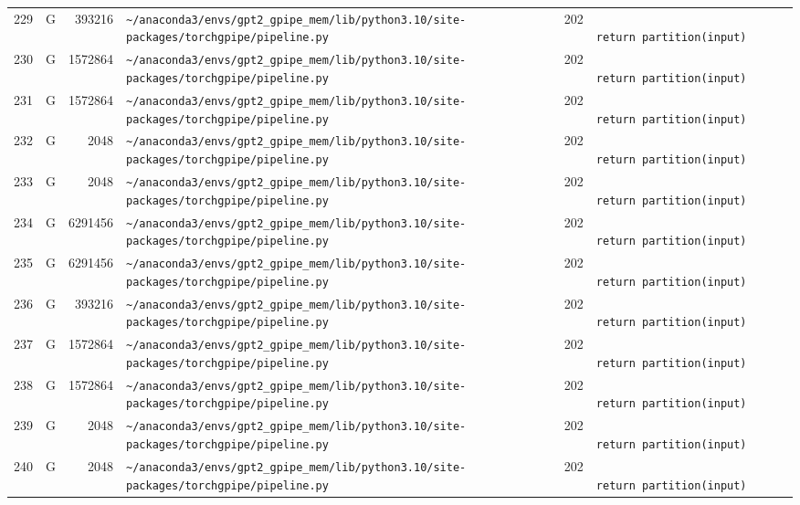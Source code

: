 \documentclass{article}
\begin{document}
\begin{longtable}{r l r p{6.5cm} r p{7.0cm}}
229 & G & 393216 & \lstinline|~/anaconda3/envs/gpt2_gpipe_mem/lib/python3.10/site-packages/torchgpipe/pipeline.py| & 202 & \lstinline|                        return partition(input)| \\
230 & G & 1572864 & \lstinline|~/anaconda3/envs/gpt2_gpipe_mem/lib/python3.10/site-packages/torchgpipe/pipeline.py| & 202 & \lstinline|                        return partition(input)| \\
231 & G & 1572864 & \lstinline|~/anaconda3/envs/gpt2_gpipe_mem/lib/python3.10/site-packages/torchgpipe/pipeline.py| & 202 & \lstinline|                        return partition(input)| \\
232 & G & 2048 & \lstinline|~/anaconda3/envs/gpt2_gpipe_mem/lib/python3.10/site-packages/torchgpipe/pipeline.py| & 202 & \lstinline|                        return partition(input)| \\
233 & G & 2048 & \lstinline|~/anaconda3/envs/gpt2_gpipe_mem/lib/python3.10/site-packages/torchgpipe/pipeline.py| & 202 & \lstinline|                        return partition(input)| \\
234 & G & 6291456 & \lstinline|~/anaconda3/envs/gpt2_gpipe_mem/lib/python3.10/site-packages/torchgpipe/pipeline.py| & 202 & \lstinline|                        return partition(input)| \\
235 & G & 6291456 & \lstinline|~/anaconda3/envs/gpt2_gpipe_mem/lib/python3.10/site-packages/torchgpipe/pipeline.py| & 202 & \lstinline|                        return partition(input)| \\
236 & G & 393216 & \lstinline|~/anaconda3/envs/gpt2_gpipe_mem/lib/python3.10/site-packages/torchgpipe/pipeline.py| & 202 & \lstinline|                        return partition(input)| \\
237 & G & 1572864 & \lstinline|~/anaconda3/envs/gpt2_gpipe_mem/lib/python3.10/site-packages/torchgpipe/pipeline.py| & 202 & \lstinline|                        return partition(input)| \\
238 & G & 1572864 & \lstinline|~/anaconda3/envs/gpt2_gpipe_mem/lib/python3.10/site-packages/torchgpipe/pipeline.py| & 202 & \lstinline|                        return partition(input)| \\
239 & G & 2048 & \lstinline|~/anaconda3/envs/gpt2_gpipe_mem/lib/python3.10/site-packages/torchgpipe/pipeline.py| & 202 & \lstinline|                        return partition(input)| \\
240 & G & 2048 & \lstinline|~/anaconda3/envs/gpt2_gpipe_mem/lib/python3.10/site-packages/torchgpipe/pipeline.py| & 202 & \lstinline|                        return partition(input)| \\

\end{longtable}
\end{document}
